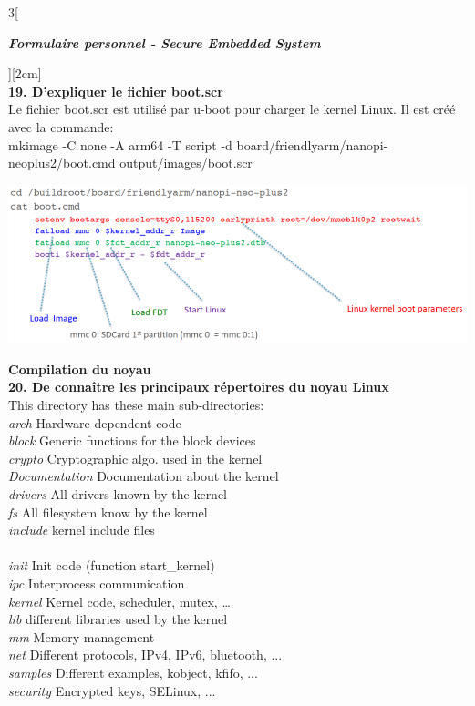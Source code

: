 \begin{multicols}{3}[\centerline{ \large\em \textbf{Formulaire personnel - Secure Embedded System}}][2cm]
\\ \textbf{19. D’expliquer le fichier boot.scr\\}
Le fichier boot.scr est utilisé par u-boot pour charger le
kernel Linux. Il est créé avec la commande:\\
mkimage -C none -A arm64 -T script -d board/friendlyarm/nanopi-neoplus2/boot.cmd output/images/boot.scr\\
\begin{minipage}{\linewidth}
	\centering
    \includegraphics[width =0.6\columnwidth]{images/12.png}
\end{minipage}
{\Large \textbf{Compilation du noyau}}
\\ \textbf{20. De connaître les principaux répertoires du noyau Linux\\}
This directory has these main sub-directories:\\
\textit{arch} Hardware dependent code\\
\textit{block} Generic functions for the block devices\\
\textit{crypto} Cryptographic algo. used in the kernel\\
\textit{Documentation} Documentation about the kernel\\
\textit{drivers} All drivers known by the kernel\\
\textit{fs} All filesystem know by the kernel\\
\textit{include} kernel include files\\\\
\textit{init} Init code (function start\_kernel)\\
\textit{ipc} Interprocess communication\\
\textit{kernel} Kernel code, scheduler, mutex, …\\
\textit{lib} different libraries used by the kernel\\
\textit{mm} Memory management\\
\textit{net} Different protocols, IPv4, IPv6, bluetooth, ...\\
\textit{samples} Different examples, kobject, kfifo, ...\\
\textit{security} Encrypted keys, SELinux, ...\\

\end{multicols}
